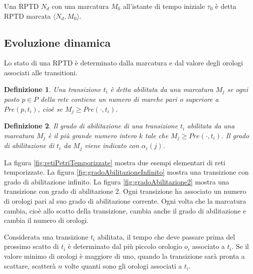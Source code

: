 \documentclass[a4paper]{report}
\newtheorem{definizione}{Definizione}
\begin{document}
Una RPTD $N_d$ con una marcatura $M_0$ all'istante di tempo iniziale
$\tau_0$ \`e detta RPTD marcata $\langle N_d, M_0 \rangle$.
\subsection{Evoluzione dinamica}
Lo stato di una RPTD \`e determinato dalla marcatura e dal valore
degli orologi associati alle transitioni.
\begin{definizione}
  Una transizione $t_i$ \`e detta abilitata da una marcatura $M_j$ se
  ogni posto $p \in P$ della rete contiene un numero di marche pari o
  superiore a $Pre(p,t_i)$, cio\`e se $M_j \geq Pre(\cdot, t_i)$.
\end{definizione}
\begin{definizione}\label{def:gradoDiAbilitazion}
  Il grado di abilitazione di una transizione $t_i$ abilitata da una
  marcatura $M_j$ \`e il pi\`u grande numero intero $k$ tale che $M_j
  \geq Pre(\cdot, t_i)$. Il grado di abilitazione di $t_i$ da $M_j$
  viene indicato con $\alpha_i(j)$.
\end{definizione}

La figura \ref{fig:retiPetriTemporizzate} mostra due esempi elementari
di reti temporizzate. La figura \ref{fig:gradoAbilitazioneInfinito}
mostra una transizione con grado di abilitazione infinito. La figura
\ref{fig:gradoAbilitazione2} mostra una transizione con grado di
abilitazione 2. Ogni transizione ha associato un numero di orologi
pari al suo grado di abilitazione corrente. Ogni volta che la
marcatura cambia, cio\`e allo scatto della transizione, cambia anche
il grado di abilitazione e cambia il numero di orologi.

Considerata una transizione $t_i$ abilitata, il tempo che deve passare
prima del prossimo scatto di $t_i$ \`e determinato dal pi\`u piccolo
orologio $o_i$ associato a $t_i$. Se il valore minimo di orologi \`e
maggiore di uno, quando la transizione sar\`a pronta a scattare,
scatter\`a $n$ volte quanti sono gli orologi associati a $t_i$.
\end{document}
